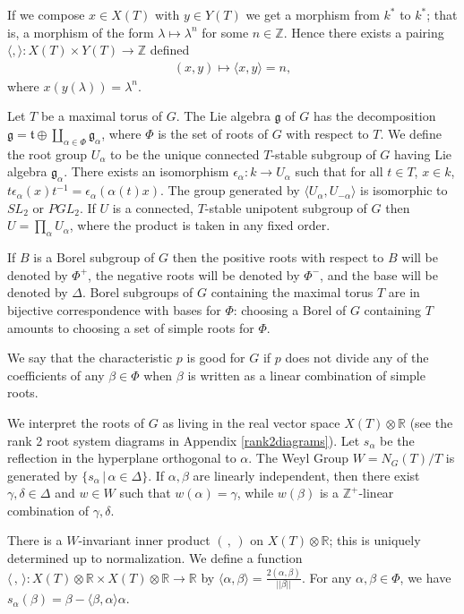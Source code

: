 If we compose $x\in X(T)$ with $y\in Y(T)$ we get a morphism from $k^*$ to $k^*$; that is, a morphism of the form $\lambda\mapsto \lambda^n$ for some $n\in \mathbb{Z}$. Hence there exists a pairing $\langle,\rangle:X(T)\times Y(T)\rightarrow \mathbb{Z}$ defined
\begin{align*}
	(x, y) \mapsto \langle x, y\rangle = n,
\end{align*}
where $x(y(\lambda)) = \lambda^n$. 

Let $T$ be a maximal torus of $G$. The Lie algebra $\mathfrak{g}$ of $G$ has the decomposition $\mathfrak{g} = \mathfrak{t} \oplus \coprod_{\alpha\in\Phi} \mathfrak{g}_\alpha$, where $\Phi$ is the set of roots of $G$ with respect to $T$. We define the root group $U_\alpha$ to be the unique connected $T$-stable subgroup of $G$ having Lie algebra $\mathfrak{g}_\alpha$. There exists an isomorphism $\epsilon_\alpha: k \rightarrow U_\alpha$ such that for all $t\in T$, $x\in k$, $t\epsilon_\alpha(x)t^{-1} = \epsilon_\alpha(\alpha(t)x)$.
The group generated by $\langle U_\alpha, U_{-\alpha}\rangle$ is isomorphic to $SL_2$ or $PGL_2$. If $U$ is a connected, $T$-stable unipotent subgroup of $G$ then $U=\prod_\alpha U_\alpha$, where the product is taken in any fixed order.

If $B$ is a Borel subgroup of $G$ then the positive roots with respect to $B$ will be denoted by $\Phi^+$, the negative roots will be denoted by $\Phi^-$, and the base will be denoted by $\Delta$. Borel subgroups of $G$ containing the maximal torus $T$ are in bijective correspondence with bases for $\Phi$: choosing a Borel of $G$ containing $T$ amounts to choosing a set of simple roots for $\Phi$.

We say that the characteristic $p$ is good for $G$ if $p$ does not divide any of the coefficients of any $\beta\in\Phi$ when $\beta$ is written as a linear combination of simple roots.

We interpret the roots of $G$ as living in the real vector space $X(T)\otimes \mathbb{R}$ (see the rank 2 root system diagrams in Appendix \ref{rank2diagrams}).
Let $s_\alpha$ be the reflection in the hyperplane orthogonal to $\alpha$. The Weyl Group $W = N_G(T)/T$ is generated by $\{s_\alpha\,|\,\alpha\in \Delta\}$. If $\alpha,\beta$ are linearly independent, then there exist $\gamma,\delta\in \Delta$ and $w\in W$ such that $w(\alpha) = \gamma$, while $w(\beta)$ is a $\mathbb{Z}^+$-linear combination of $\gamma, \delta$.

There is a $W$-invariant inner product $(\,,\,)$ on $X(T)\otimes \mathbb{R}$; this is uniquely determined up to normalization. We define a function $\langle\,,\,\rangle: X(T)\otimes\mathbb{R} \times X(T)\otimes\mathbb{R} \rightarrow \mathbb{R}$ by $\displaystyle \langle \alpha, \beta\rangle = \frac{2(\alpha, \beta)}{|\!|\beta|\!|}$. For any $\alpha, \beta\in\Phi$, we have $s_\alpha(\beta) = \beta - \langle \beta, \alpha\rangle \alpha$.

